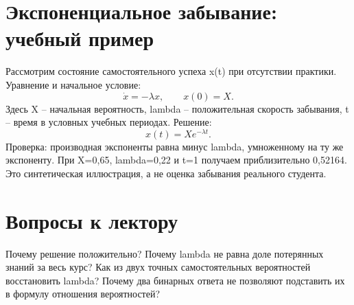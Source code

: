 \section{Экспоненциальное забывание: учебный пример}
Рассмотрим состояние самостоятельного успеха x(t) при отсутствии практики.
Уравнение и начальное условие:
$$\dot x=-\lambda x,\qquad x(0)=X.$$
Здесь X – начальная вероятность, lambda – положительная скорость забывания,
t – время в условных учебных периодах. Решение:
$$x(t)=X e^{-\lambda t}.$$
Проверка: производная экспоненты равна минус lambda, умноженному на ту же экспоненту.
При X=0,65, lambda=0,22 и t=1 получаем приблизительно 0,52164.
Это синтетическая иллюстрация, а не оценка забывания реального студента.

\section{Вопросы к лектору}
Почему решение положительно? Почему lambda не равна доле потерянных знаний
за весь курс? Как из двух точных самостоятельных вероятностей восстановить lambda?
Почему два бинарных ответа не позволяют подставить их в формулу отношения вероятностей?
